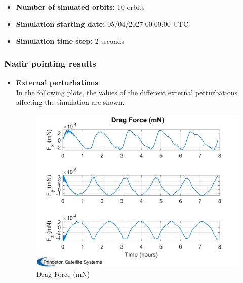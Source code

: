 \begin{itemize}
\begin{itemize}
    \end{itemize}

    \item \textbf{Number of simuated orbits:} 10 orbits
    \item \textbf{Simulation starting date:} 05/04/2027 00:00:00 UTC
    \item \textbf{Simulation time step:} 2 seconds
\end{itemize}

\subsubsection{Nadir pointing results}
\begin{itemize}
    \item \textbf{External perturbations}\\
    In the following plots, the values of the different external perturbations affecting
    the simulation are shown.
    \begin{figure}[H]
    \centering
    \begin{minipage}{0.48\linewidth}
        \centering
        \includegraphics[width=0.95\linewidth]{res/img/Nadir_no_EKF/Drag Force (mN).png}
        \caption{Drag Force (mN)}
        \label{fig:DragForce}
    \end{minipage}\hfill
    \begin{minipage}{0.48\linewidth}
        \centering

\end{minipage}
\end{figure}
\end{itemize}

